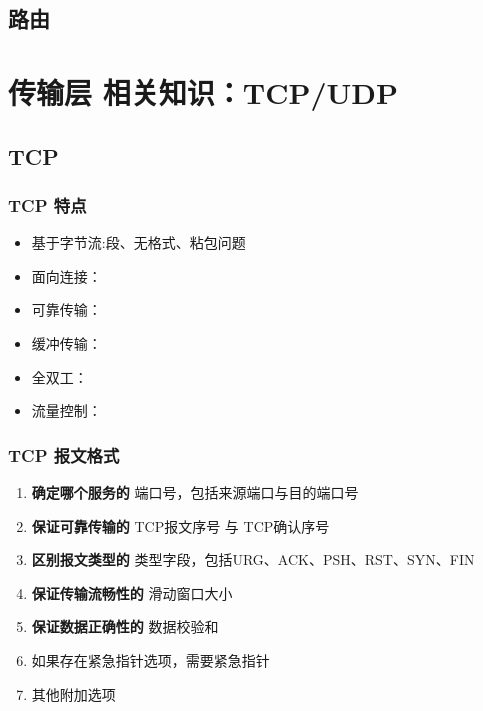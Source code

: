\documentclass[UTF8,a4paper,8pt]{ctexbook}
\begin{document}
		\subsection{路由}
	
	\section{传输层 相关知识：TCP/UDP }
		\subsection{TCP}
			\subsubsection{TCP 特点}
				\begin{itemize}
					\item 基于字节流:段、无格式、粘包问题
					\item 面向连接：
					\item 可靠传输：
					\item 缓冲传输：
					\item 全双工：
					\item 流量控制：
				\end{itemize}
			\subsubsection{TCP 报文格式}
				\begin{enumerate}[itemindent = 2em]
					\item 	\textbf{确定哪个服务的} 端口号，包括来源端口与目的端口号
					\item 	\textbf{保证可靠传输的} TCP报文序号 与 TCP确认序号
					\item   \textbf{区别报文类型的} 类型字段，包括URG、ACK、PSH、RST、SYN、FIN
					\item 	\textbf{保证传输流畅性的} 滑动窗口大小
					\item   \textbf{保证数据正确性的} 数据校验和
					\item   如果存在紧急指针选项，需要紧急指针
					\item   其他附加选项
				\end{enumerate}
			
\end{document}
